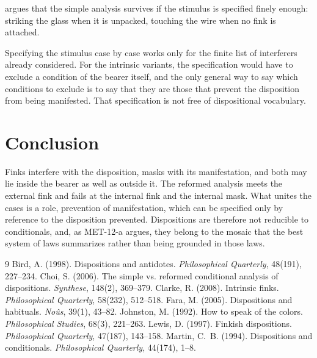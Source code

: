\documentclass{situationist-preprint}
\begin{document}
\begin{objection}
\citet{Choi2006} argues that the simple analysis survives if the stimulus is specified finely enough: striking the glass when it is unpacked, touching the wire when no fink is attached.
\end{objection}

\begin{reply}
Specifying the stimulus case by case works only for the finite list of interferers already considered. For the intrinsic variants, the specification would have to exclude a condition of the bearer itself, and the only general way to say which conditions to exclude is to say that they are those that prevent the disposition from being manifested. That specification is not free of dispositional vocabulary.
\end{reply}

\section{Conclusion}

Finks interfere with the disposition, masks with its manifestation, and both may lie inside the bearer as well as outside it. The reformed analysis meets the external fink and fails at the internal fink and the internal mask. What unites the cases is a role, prevention of manifestation, which can be specified only by reference to the disposition prevented. Dispositions are therefore not reducible to conditionals, and, as MET-12-a argues, they belong to the mosaic that the best system of laws summarizes rather than being grounded in those laws.

\begin{thebibliography}{9}\small
{} Bird, A. (1998). Dispositions and antidotes. \emph{Philosophical Quarterly}, 48(191), 227--234.
 Choi, S. (2006). The simple vs. reformed conditional analysis of dispositions. \emph{Synthese}, 148(2), 369--379.
 Clarke, R. (2008). Intrinsic finks. \emph{Philosophical Quarterly}, 58(232), 512--518.
 Fara, M. (2005). Dispositions and habituals. \emph{No\^us}, 39(1), 43--82.
 Johnston, M. (1992). How to speak of the colors. \emph{Philosophical Studies}, 68(3), 221--263.
 Lewis, D. (1997). Finkish dispositions. \emph{Philosophical Quarterly}, 47(187), 143--158.
 Martin, C.~B. (1994). Dispositions and conditionals. \emph{Philosophical Quarterly}, 44(174), 1--8.
\end{thebibliography}
\end{document}
